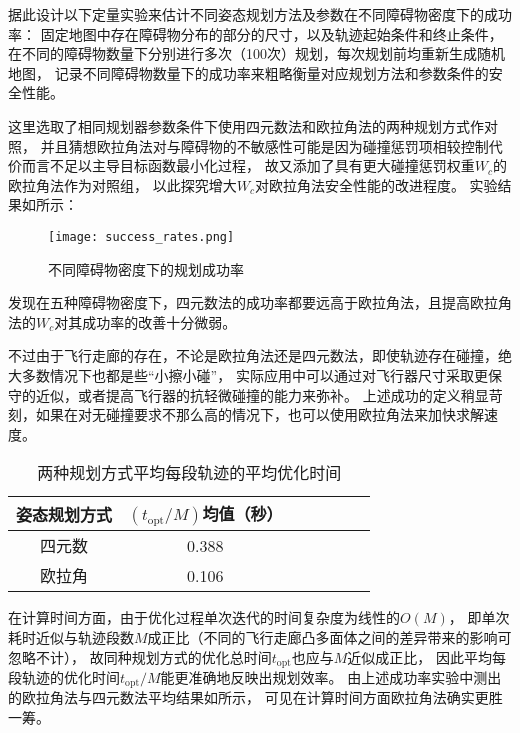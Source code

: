 据此设计以下定量实验来估计不同姿态规划方法及参数在不同障碍物密度下的成功率：
固定地图中存在障碍物分布的部分的尺寸，以及轨迹起始条件和终止条件，
在不同的障碍物数量下分别进行多次（100次）规划，每次规划前均重新生成随机地图，
记录不同障碍物数量下的成功率来粗略衡量对应规划方法和参数条件的安全性能。

这里选取了相同规划器参数条件下使用四元数法和欧拉角法的两种规划方式作对照，
并且猜想欧拉角法对与障碍物的不敏感性可能是因为碰撞惩罚项相较控制代价而言不足以主导目标函数最小化过程，
故又添加了具有更大碰撞惩罚权重$W_c$的欧拉角法作为对照组，
以此探究增大$W_c$对欧拉角法安全性能的改进程度。
实验结果如所示：

\begin{figure}[ht]
    \centering
    \texttt{[image: success\_rates.png]}
    \caption{不同障碍物密度下的规划成功率}
    \label{fig:success_rates}
\end{figure}

发现在五种障碍物密度下，四元数法的成功率都要远高于欧拉角法，且提高欧拉角法的$W_c$对其成功率的改善十分微弱。

不过由于飞行走廊的存在，不论是欧拉角法还是四元数法，即使轨迹存在碰撞，绝大多数情况下也都是些“小擦小碰”，
实际应用中可以通过对飞行器尺寸采取更保守的近似，或者提高飞行器的抗轻微碰撞的能力来弥补。
上述成功的定义稍显苛刻，如果在对无碰撞要求不那么高的情况下，也可以使用欧拉角法来加快求解速度。

\begin{table}[htbp]
    \caption{两种规划方式平均每段轨迹的平均优化时间\label{tab:mean_opt_time_per_segment}}
    \vspace{0.5em}\centering\wuhao
    \begin{tabular}{ccccccc}
    \toprule[1.5pt]
    姿态规划方式 &  $({{t_{\text{opt}}}}/M)$均值（秒）\\
    \midrule[1pt]
    四元数 & 0.388 \\
    欧拉角 & 0.106 \\
    \bottomrule[1.5pt]
    \end{tabular}
\end{table}

在计算时间方面，由于优化过程单次迭代的时间复杂度为线性的$O(M)$，
即单次耗时近似与轨迹段数$M$成正比（不同的飞行走廊凸多面体之间的差异带来的影响可忽略不计），
故同种规划方式的优化总时间$t_{\text{opt}}$也应与$M$近似成正比，
因此平均每段轨迹的优化时间$t_{\text{opt}}/M$能更准确地反映出规划效率。
由上述成功率实验中测出的欧拉角法与四元数法平均结果如所示，
可见在计算时间方面欧拉角法确实更胜一筹。


